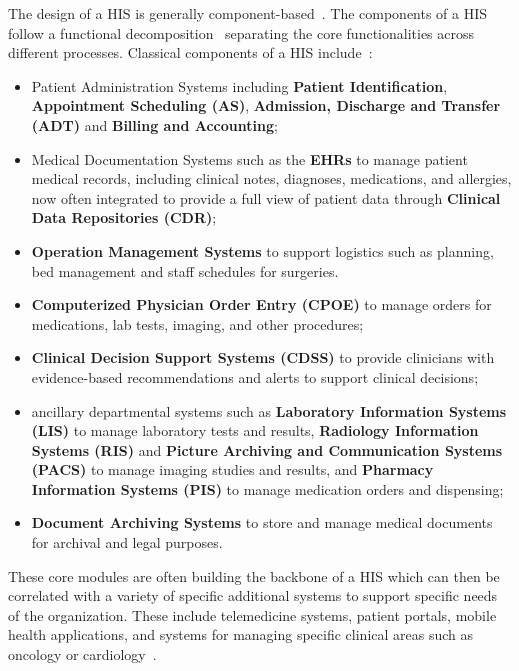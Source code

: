 The design of a \ac{HIS} is generally component-based~\cite{Van_De_Velde_Degoulet_2003, Winter_Ammenwerth_Haux_Marschollek_Steiner_Jahn_2023}.
%
The components of a \ac{HIS} follow a functional decomposition~\cite{Winter_Ammenwerth_Haux_Marschollek_Steiner_Jahn_2023} separating the core functionalities across different processes. 
%
Classical components of a \ac{HIS} include~\cite{Winter_Ammenwerth_Haux_Marschollek_Steiner_Jahn_2023}:
\begin{itemize}
    \item Patient Administration Systems including \textbf{Patient Identification}, \textbf{Appointment Scheduling (AS)}, \textbf{Admission, Discharge and Transfer (ADT)} and \textbf{Billing and Accounting};
    \item Medical Documentation Systems such as the \textbf{\acp{EHR}} to manage patient medical records, including clinical notes, diagnoses, medications, and allergies, now often integrated to provide a full view of patient data through \textbf{Clinical Data Repositories (CDR)};
    \item \textbf{Operation Management Systems} to support logistics such as planning, bed management and staff schedules for surgeries.
    \item \textbf{Computerized Physician Order Entry (CPOE)} to manage orders for medications, lab tests, imaging, and other procedures;
    \item \textbf{Clinical Decision Support Systems (CDSS)} to provide clinicians with evidence-based recommendations and alerts to support clinical decisions;
    \item ancillary departmental systems such as \textbf{Laboratory Information Systems (LIS)} to manage laboratory tests and results, \textbf{Radiology Information Systems (RIS)} and \textbf{Picture Archiving and Communication Systems (PACS)} to manage imaging studies and results, and \textbf{Pharmacy Information Systems (PIS)} to manage medication orders and dispensing;
    \item \textbf{Document Archiving Systems} to store and manage medical documents for archival and legal purposes. 
\end{itemize}

These core modules are often building the backbone of a \ac{HIS} which can then be correlated with a variety of specific additional systems to support specific needs of the organization. 
%
These include telemedicine systems, patient portals, mobile health applications, and systems for managing specific clinical areas such as oncology or cardiology~\cite{Winter_Ammenwerth_Haux_Marschollek_Steiner_Jahn_2023}.

